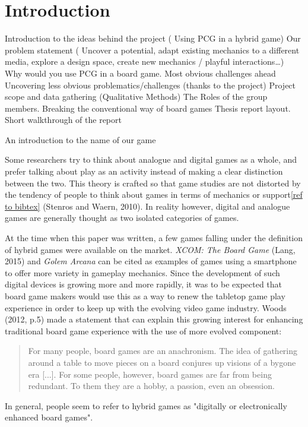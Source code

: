 \chapter{Introduction}
Introduction to the ideas behind the project  ( Using PCG in a hybrid game)
Our problem statement ( Uncover a potential, adapt existing mechanics to a different media, explore a design space, create new mechanics / playful interactions…)
Why would you use PCG in a board game.
Most obvious challenges ahead
Uncovering less obvious problematics/challenges (thanks to the project)
Project scope and data gathering (Qualitative Methods)
The Roles of the group members.
Breaking the conventional way of board games
Thesis report layout. Short walkthrough of the report

An introduction to the name of our game

Some researchers try to think about analogue and digital games as a whole, and prefer talking about play as an activity instead of making a clear distinction between the two. This theory is crafted so that game studies are not distorted by the tendency of people to think about games in terms of mechanics or support\ref{ref to bibtex} (Stenros and Waern, 2010). In reality however, digital and analogue games are generally thought as two isolated categories of games.

At the time when this paper was written, a few games falling under the definition of hybrid games were available on the market. \textit{XCOM: The Board Game} (Lang, 2015)\cite{game:xcomtbg} and \textit{Golem Arcana} can be cited as examples of games using a smartphone to offer more variety in gameplay mechanics. Since the development of such digital devices is growing more and more rapidly, it was to be expected that board game makers would use this as a way to renew the tabletop game play experience in order to keep up with the evolving video game industry. Woods (2012, p.5) made a statement that can explain this growing interest for enhancing traditional board game experience with the use of more evolved component:

\begin{quotation}
For many people, board games are an anachronism. The idea of gathering around a table to move pieces on a board conjures up visions of a bygone era [...]. For some people, however, board games are far from being redundant. To them they are a hobby, a passion, even an obsession.
\end{quotation}

In general, people seem to refer to hybrid games as "digitally or electronically enhanced board games". 


